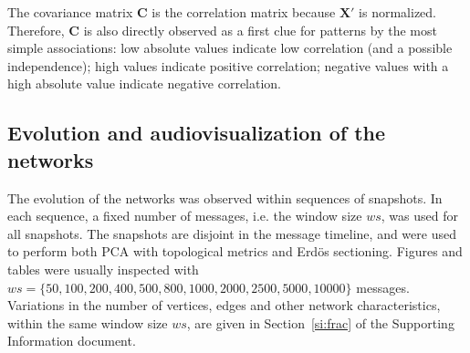 \documentclass[%
	aip,
	jmp,%
	amsmath,amssymb,
	reprint,%
]{revtex4-1}
\begin{document}
																																																																																The covariance matrix 
																																																																																$\mathbf{C}$ is the correlation matrix because $\mathbf{X'}$ is normalized.
																																																																																Therefore, $\mathbf{C}$ is also directly observed as a first clue for patterns
																																																																																by the most simple associations:
																																																																																low absolute values indicate low correlation (and a possible independence);
																																																																																high values indicate positive correlation;
																																																																																negative values with a high absolute value indicate negative correlation.

																																																																																\subsection{Evolution and audiovisualization of the networks}\label{sec:viz}
																																																																																The evolution of the networks was observed within 
																																																																																sequences of snapshots. In each sequence, a fixed number of messages,
																																																																																i.e. the window size $ws$, was used for all snapshots.
																																																																																The snapshots are disjoint in the message timeline, and were used to perform both PCA with topological metrics and Erd\"os sectioning.  
																																																																																Figures and tables were usually inspected with 
																																																																																$ws=\{50, 100, 200, 400, 500, 800, 1000, 2000, 2500, 5000, 10000\}$ messages. Variations in the number of vertices, edges
																																																																																and other network characteristics, within the same window size $ws$,
																																																																																are given in Section~\ref{si:frac} of the Supporting Information document. 
\end{document}
